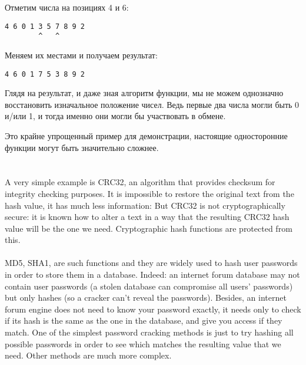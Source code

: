 Отметим числа на позициях 4 и 6:

\begin{lstlisting}
4 6 0 1 3 5 7 8 9 2
        ^   ^
\end{lstlisting}

Меняем их местами и получаем результат:

\begin{lstlisting}
4 6 0 1 7 5 3 8 9 2
\end{lstlisting}

Глядя на результат, и даже зная алгоритм функции, мы не можем однозначно восстановить изначальное
положение чисел.
Ведь первые два числа могли быть 0 и/или 1, и тогда именно они могли бы участвовать в обмене.

Это крайне упрощенный пример для демонстрации, настоящие односторонние функции могут быть значительно сложнее.
\fi %


\ifdefined\ENGLISH
\newcommand{\HashFuncChapterName}{%
}
\section{\HashFuncChapterName}
\label{hash_func}

\myindex{\HashFuncChapterName}
A very simple example is CRC32, an algorithm that provides  checksum for integrity checking purposes.
It is impossible to restore the original text from the hash value, it has much less information:
But CRC32 is not cryptographically secure: it is known how to alter a text in a way that the resulting
CRC32 hash value will be the one we need.
Cryptographic hash functions are protected from this. \\
\\
MD5, SHA1, \etc{} are such functions and they are widely used to hash user passwords in order to store them in a database.
Indeed: an internet forum database may not contain user passwords 
(a stolen database can compromise all users' passwords) but only hashes 
(so a cracker can't reveal the passwords).
Besides, an internet forum engine does not need to know your password exactly, it needs only to check if its hash
is the same as the one in the database, and give you access if they match.
One of the simplest password cracking methods is just to try hashing all possible passwords in order
to see which matches the resulting value that we need.
Other methods are much more complex.

